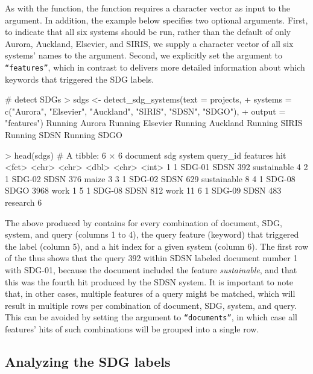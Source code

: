 As with the  function, the  function requires a character vector as input to the  argument. In addition, the example below specifies two optional arguments. First, to indicate that all six systems should be run, rather than the default of only Aurora, Auckland, Elsevier, and SIRIS, we supply a character vector of all six systems’ names to the  argument. Second, we explicitly set the  argument to \texttt{“features”}, which in contrast to  delivers more detailed information about which keywords that triggered the SDG labels.     

\begin{example}
# detect SDGs
> sdgs <- detect_sdg_systems(text = projects,
+                            systems = c("Aurora", "Elsevier", "Auckland", "SIRIS", "SDSN", "SDGO"),
+                            output = "features")
Running Aurora
Running Elsevier
Running Auckland
Running SIRIS
Running SDSN
Running SDGO
    
> head(sdgs)
# A tibble: 6 × 6
  document sdg    system query_id features      hit
  <fct>    <chr>  <chr>     <dbl> <chr>       <int>
1 1        SDG-01 SDSN        392 sustainable     4
2 1        SDG-02 SDSN        376 maize           3
3 1        SDG-02 SDSN        629 sustainable     8
4 1        SDG-08 SDGO       3968 work            1
5 1        SDG-08 SDSN        812 work           11
6 1        SDG-09 SDSN        483 research        6
    
\end{example}

The above  produced by  contains for every combination of document, SDG, system, and query (columns 1 to 4), the query feature (keyword) that triggered the label (column 5), and a hit index for a given system (column 6). The first row of the  thus shows that the query 392 within SDSN labeled document number 1 with SDG-01, because the document included the feature \textit{sustainable}, and that this was the fourth hit produced by the SDSN system. It is important to note that, in other cases, multiple features of a query might be matched, which will result in multiple rows per combination of document, SDG, system, and query. This can be avoided by setting the  argument to \texttt{“documents”}, in which case all features' hits of such combinations will be grouped into a single row. 

\subsection{Analyzing the SDG labels}


